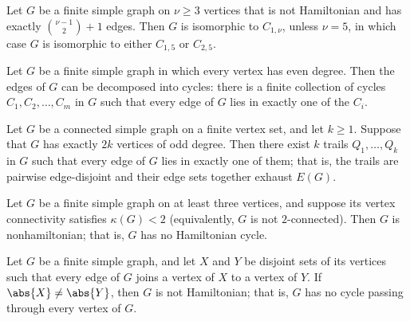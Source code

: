 \begin{theorem}
\label{SimpleGraph.ore_bondy_extremal}
Let $G$ be a finite simple graph on $\nu \ge 3$ vertices that is not Hamiltonian and has
exactly $\binom{\nu-1}{2}+1$ edges. Then $G$ is isomorphic to $C_{1,\nu}$, unless $\nu =
5$, in which case $G$ is isomorphic to either $C_{1,5}$ or $C_{2,5}$.
\end{theorem}

\begin{theorem}
\label{SimpleGraph.even_degree_cycle_decomposition}
Let $G$ be a finite simple graph in which every vertex has even degree. Then the edges
of $G$ can be decomposed into cycles: there is a finite collection of cycles $C_1, C_2,
\ldots, C_m$ in $G$ such that every edge of $G$ lies in exactly one of the $C_i$.
\end{theorem}

\begin{theorem}
\label{SimpleGraph.odd_vertices_trail_cover}
Let $G$ be a connected simple graph on a finite vertex set, and let $k \ge 1$. Suppose
that $G$ has exactly $2k$ vertices of odd degree. Then there exist $k$ trails $Q_1,
\dots, Q_k$ in $G$ such that every edge of $G$ lies in exactly one of them; that is, the
trails are pairwise edge-disjoint and their edge sets together exhaust $E(G)$.
\end{theorem}

\begin{theorem}
\label{SimpleGraph.nonhamiltonian_of_not_two_connected}
Let $G$ be a finite simple graph on at least three vertices, and suppose its vertex
connectivity satisfies $\kappa(G) < 2$ (equivalently, $G$ is not $2$-connected). Then
$G$ is nonhamiltonian; that is, $G$ has no Hamiltonian cycle.
\end{theorem}

\begin{theorem}
\label{SimpleGraph.nonhamiltonian_of_unbalanced_bipartite}
Let $G$ be a finite simple graph, and let $X$ and $Y$ be disjoint sets of its vertices
such that every edge of $G$ joins a vertex of $X$ to a vertex of $Y$. If $\abs{X} \neq
\abs{Y}$, then $G$ is not Hamiltonian; that is, $G$ has no cycle passing through every
vertex of $G$.
\end{theorem}

